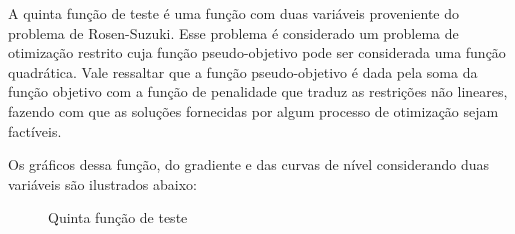 A quinta função de teste é uma função com duas variáveis proveniente do problema de Rosen-Suzuki. Esse problema é considerado um problema de otimização restrito cuja função pseudo-objetivo pode ser considerada uma função quadrática. Vale ressaltar que a função pseudo-objetivo é dada pela soma da função objetivo com a função de penalidade que traduz as restrições não lineares, fazendo com que as soluções fornecidas por algum processo de otimização sejam factíveis.\par
Os gráficos dessa função, do gradiente e das curvas de nível considerando duas variáveis são ilustrados abaixo:

\begin{figure}[h!]
    \centering 
    \qquad
    \qquad
    \caption{Quinta função de teste}%
    \label{fig:quifun}%
\end{figure}
\FloatBarrier

